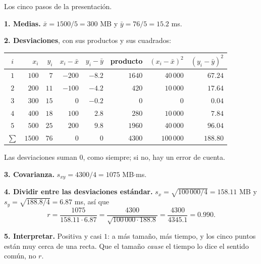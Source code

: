 \documentclass[11pt,letterpaper]{article}
\begin{document}
\begin{ejemplo}
    Los cinco pasos de la presentación.

    \textbf{1. Medias.} $\bar{x} = 1500 / 5 = 300$ MB y
    $\bar{y} = 76 / 5 = 15.2$ ms.

    \textbf{2. Desviaciones}, con sus productos y sus cuadrados:
    \begin{center}
    \small
    \begin{tabular}{crrrrrrr}
        \toprule
        $i$ & $x_i$ & $y_i$ & $x_i - \bar{x}$ & $y_i - \bar{y}$
        & producto & $(x_i - \bar{x})^2$ & $(y_i - \bar{y})^2$ \\
        \midrule
        $1$ & $100$ & $7$ & $-200$ & $-8.2$
            & $1640$ & $40\,000$ & $67.24$ \\
        $2$ & $200$ & $11$ & $-100$ & $-4.2$
            & $420$ & $10\,000$ & $17.64$ \\
        $3$ & $300$ & $15$ & $0$ & $-0.2$
            & $0$ & $0$ & $0.04$ \\
        $4$ & $400$ & $18$ & $100$ & $2.8$
            & $280$ & $10\,000$ & $7.84$ \\
        $5$ & $500$ & $25$ & $200$ & $9.8$
            & $1960$ & $40\,000$ & $96.04$ \\
        \midrule
        $\sum$ & $1500$ & $76$ & $0$ & $0$
               & $4300$ & $100\,000$ & $188.80$ \\
        \bottomrule
    \end{tabular}
    \end{center}
    Las desviaciones suman $0$, como siempre; si no, hay un error de
    cuenta.

    \textbf{3. Covarianza.} $s_{xy} = 4300 / 4 = 1075$ MB$\cdot$ms.

    \textbf{4. Dividir entre las desviaciones estándar.}
    $s_x = \sqrt{100\,000 / 4} = 158.11$ MB y
    $s_y = \sqrt{188.8 / 4} = 6.87$ ms, así que
    \[
        r = \frac{1075}{158.11 \cdot 6.87}
          = \frac{4300}{\sqrt{100\,000 \cdot 188.8}}
          = \frac{4300}{4345.1} = 0.990 .
    \]

    \textbf{5. Interpretar.} Positiva y casi $1$: a más tamaño, más
    tiempo, y los cinco puntos están muy cerca de una recta. Que el
    tamaño \emph{cause} el tiempo lo dice el sentido común, no $r$.
\end{ejemplo}

\end{document}

